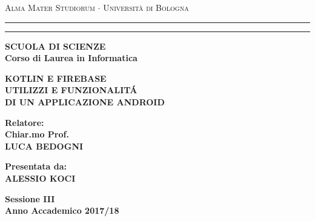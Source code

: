 \begin{titlepage}
\begin{center}
{{\Large{\textsc{Alma Mater Studiorum $\cdot$ Universit\`a di
Bologna}}}} \rule[0.1cm]{13.8cm}{0.1mm}
\rule[0.5cm]{13.8cm}{0.6mm}
{\bf SCUOLA DI SCIENZE\\
Corso di Laurea in Informatica }
\end{center}
\vspace{25mm}
\begin{center}
 {\large{\bf KOTLIN E FIREBASE}}\\
 \vspace{2mm}
 {\large{\bf UTILIZZI E FUNZIONALIT\'A}}\\
 \vspace{2mm}
 {\large{\bf DI UN APPLICAZIONE ANDROID}}\\
 \end{center}
 \vspace{30mm}
 \par
 \noindent
 \begin{minipage}[t]{0.5\textwidth}
 {\large{\bf Relatore:\\
 Chiar.mo Prof.\\
 LUCA BEDOGNI}}\\
 \end{minipage}
 \hfill
 \begin{minipage}[t]{0.5\textwidth}\raggedleft
 {\large{\bf Presentata da:\\
 ALESSIO KOCI}}
\end{minipage}
\vspace{30mm}
\begin{center}
{\large{\bf Sessione III\\%
Anno Accademico 2017/18}}%
\end{center}
\end{titlepage}
